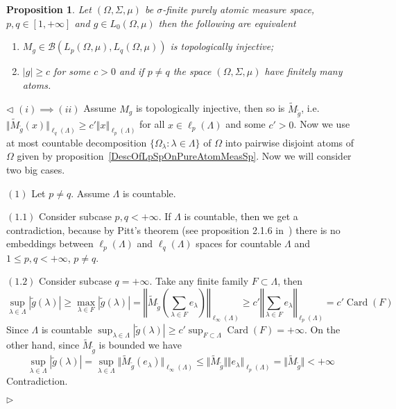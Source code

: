 \documentclass[12pt]{article}
\newtheorem{proposition}[theorem]{Proposition}
\newenvironment{proof}{\par $\triangleleft$}{$\triangleright$}
\begin{document}
\begin{proposition}\label{TopInjMultOpCharacOnPureAtomMeasSp} Let
    $(\Omega,\Sigma,\mu)$ be $\sigma$-finite purely atomic measure space,
    $p,q\in[1,+\infty]$ and $g\in L_0(\Omega,\mu)$ then the following are
    equivalent
    \begin{enumerate}[label = (\roman*)]
        \item $M_g\in\mathcal{B}(L_p(\Omega,\mu),L_q(\Omega,\mu))$ is
              topologically injective;

        \item $|g|\geq c$ for some $c>0$ and if $p\neq q$ the space
              $(\Omega,\Sigma,\mu)$ have finitely many atoms.
    \end{enumerate}
\end{proposition}
\begin{proof}
    $(i)\implies (ii)$ Assume $M_g$ is topologically injective, then so is
    $\widetilde{M}_{\widetilde{g}}$, i.e.
    $\Vert\widetilde{M}_{\widetilde{g}}(x)\Vert_{\ell_q(\Lambda)}
        \geq c'\Vert x\Vert_{\ell_p(\Lambda)}$ 
    for all $x\in\ell_p(\Lambda)$ and some $c'>0$. Now
    we use at most countable decomposition 
    $ \{\Omega_\lambda:\lambda\in\Lambda \}$ of $\Omega$ 
    into pairwise disjoint atoms of $\Omega$ given by
    proposition~\ref{DescOfLpSpOnPureAtomMeasSp}. Now we will consider two big
    cases.

    $(1)$ Let $p\neq q$. Assume $\Lambda$ is countable.

    $(1.1)$ Consider subcase $p,q<+\infty$. If $\Lambda$ is countable, then we
    get a  contradiction, because by Pitt's theorem (see proposition 2.1.6
    in~\cite{KalAlbTopicsBanSpTh}) there is no embeddings between
    $\ell_p(\Lambda)$ and $\ell_q(\Lambda)$ spaces for countable $\Lambda$ and
    $1\leq p,q<+\infty$, $p\neq q$.

    $(1.2)$ Consider subcase $q=+\infty$. Take any finite family
    $F\subset\Lambda$, then
    $$
        \sup_{\lambda\in\Lambda}|\widetilde{g}(\lambda)|
        \geq\max_{\lambda\in F}|\widetilde{g}(\lambda)|
        =\left\Vert\widetilde{M}_{\widetilde{g}}\left(
        \sum_{\lambda\in F}e_\lambda
        \right)\right\Vert_{\ell_\infty(\Lambda)}
        \geq c'\left\Vert
        \sum_{\lambda\in F}e_\lambda
        \right\Vert_{\ell_p(\Lambda)}
        =c'\operatorname{Card}(F)
    $$
    Since $\Lambda$ is countable
    $\sup_{\lambda\in\Lambda}|\widetilde{g}(\lambda)|\geq
        c'\sup_{F\subset\Lambda}\operatorname{Card}(F)=+\infty$. 
    On the other hand, since $\widetilde{M}_{\widetilde{g}}$ is bounded we have
    $$
        \sup_{\lambda\in\Lambda}|\widetilde{g}(\lambda)|
        =\sup_{\lambda\in\Lambda}\Vert
        \widetilde{M}_{\widetilde{g}}(e_\lambda)\Vert_{\ell_\infty(\Lambda)}
        \leq\Vert\widetilde{M}_{\widetilde{g}}\Vert\Vert
        e_\lambda\Vert_{\ell_p(\Lambda)}
        =\Vert\widetilde{M}_{\widetilde{g}}\Vert<+\infty
    $$
    Contradiction.


\end{proof}
\end{document}

